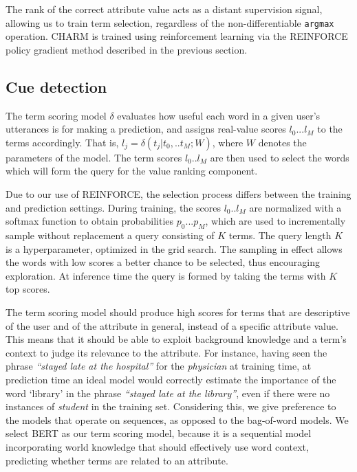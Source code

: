The rank of the correct attribute value acts as a distant supervision signal, allowing us to train term selection, regardless of the non-differentiable \texttt{argmax} operation.
CHARM is trained using reinforcement learning via the REINFORCE policy gradient method described in the previous section.


\subsection{Cue detection}
\label{sec:term-selection}

The  term scoring model $\delta$ evaluates how useful
each word in a given user's utterances is for making a prediction,
and assigns real-value scores $l_0 ... l_M$ to the terms accordingly. 
That is,
    $l_j = \delta (t_j | t_0, .. t_M; W)$,
where $W$ denotes the parameters of the model. The term scores $l_0 .. l_M$ are then used to select the words which will form the query for the value ranking component. 

Due to our use of REINFORCE, the selection process differs between the training and prediction settings.
During training, the scores $l_0 .. l_M$ are normalized with a softmax function to obtain
probabilities $p_0 ... p_M$, which are used to incrementally sample without replacement a query consisting of $K$ terms. The query length $K$ is a hyperparameter, optimized in the grid search.
The sampling in effect allows the words with low scores a better chance to be selected,
thus encouraging exploration. At inference time the query is formed by taking the terms with $K$ top scores.

The term scoring model 
should produce high scores for terms that are descriptive of the user and of the attribute in general, instead of a specific attribute value. This means that it should be able to exploit background knowledge and a term's context to 
judge its relevance to the attribute.
For instance, having seen the phrase \emph{``stayed late at the hospital''} for the 
\emph{physician} at training time, at prediction time an ideal model would correctly estimate the importance of the word `library' in the phrase \emph{``stayed late at the library''}, even if there were no instances of \emph{student} in the training set. Considering this, we give preference to the models that operate on sequences, as opposed to the bag-of-word models. We select BERT \cite{devlin2018bert} as our term scoring model, because it is a sequential model incorporating world knowledge that should effectively use word context, predicting whether terms are related to an attribute.

